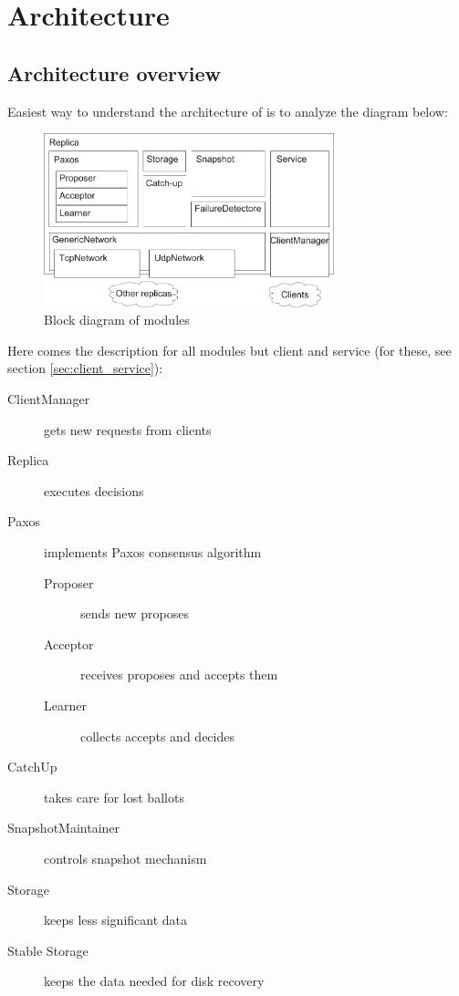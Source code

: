 \chapter{Architecture}

\section{Architecture overview}
\indent\par
Easiest way to understand the architecture of \paxosJava is to analyze the diagram below:

\begin{figure}[h]
 \centering
 \includegraphics[keepaspectratio, width=0.75\textwidth]{architecture/replica_architecture.pdf}
 \caption{Block diagram of \paxosJava modules}
 \label{fig:replica_architecture}
\end{figure}

Here comes the description for all modules but client and service (for these, see section \ref{sec:client_service}):

\begin{description}
  \item[ClientManager ] gets new requests from clients
  \item[Replica ] executes decisions
  \item[Paxos ] implements Paxos consensus algorithm
  \begin{description}
    \item[Proposer ] sends new proposes
    \item[Acceptor ] receives proposes and accepts them
    \item[Learner ] collects accepts and decides
  \end{description}
  \item[CatchUp ] takes care for lost ballots
  \item[SnapshotMaintainer ] controls snapshot mechanism
  \item[Storage ] keeps less significant data
  \item[Stable Storage ] keeps the data needed for disk recovery
\end{description}

